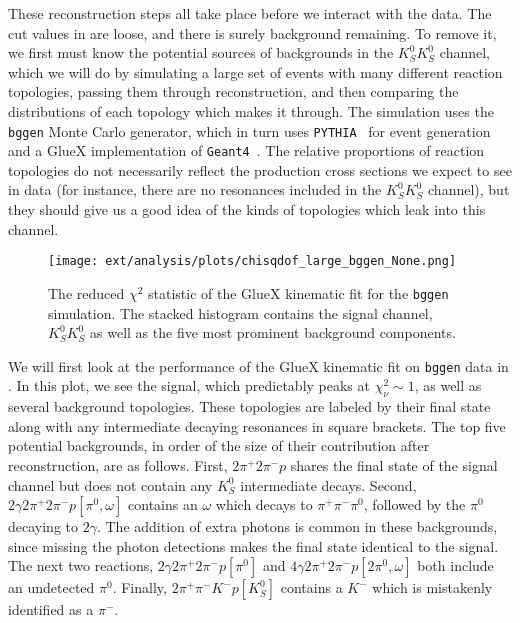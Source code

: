 These reconstruction steps all take place before we interact with the data. The cut values in  are loose, and there is surely background remaining. To remove it, we first must know the potential sources of backgrounds in the $K_S^0K_S^0$ channel, which we will do by simulating a large set of events with many different reaction topologies, passing them through reconstruction, and then comparing the distributions of each topology which makes it through. The simulation uses the \texttt{bggen} Monte Carlo generator, which in turn uses \texttt{PYTHIA}~\cite{Bierlich2022} for event generation and a GlueX implementation of \texttt{Geant4}~\cite{Allison2006,Allison2016,Agostinelli2003}. The relative proportions of reaction topologies do not necessarily reflect the production cross sections we expect to see in data (for instance, there are no resonances included in the $K_S^0K_S^0$ channel), but they should give us a good idea of the kinds of topologies which leak into this channel.

\begin{figure}
  \begin{center}
    \texttt{[image: ext/analysis/plots/chisqdof\_large\_bggen\_None.png]}
  \end{center}
  \caption{The reduced $\chi^2$ statistic of the GlueX kinematic fit for the \texttt{bggen} simulation. The stacked histogram contains the signal channel, $K_S^0K_S^0$ as well as the five most prominent background components.}\label{fig:bggen-chisqdof}
\end{figure}

We will first look at the performance of the GlueX kinematic fit on \texttt{bggen} data in . In this plot, we see the signal, which predictably peaks at $\chi^2_\nu \sim 1$, as well as several background topologies. These topologies are labeled by their final state along with any intermediate decaying resonances in square brackets. The top five potential backgrounds, in order of the size of their contribution after reconstruction, are as follows. First, $2\pi^+2\pi^- p$ shares the final state of the signal channel but does not contain any $K_S^0$ intermediate decays. Second, $2\gamma 2\pi^+ 2\pi^- p [\pi^0, \omega]$ contains an $\omega$ which decays to $\pi^+\pi^-\pi^0$, followed by the $\pi^0$ decaying to $2\gamma$. The addition of extra photons is common in these backgrounds, since missing the photon detections makes the final state identical to the signal. The next two reactions, $2\gamma 2\pi^+ 2\pi^- p [\pi^0]$ and $4\gamma 2\pi^+ 2\pi^- p [2\pi^0, \omega]$ both include an undetected $\pi^0$. Finally, $2\pi^+\pi^- K^- p[K_S^0]$ contains a $K^-$ which is mistakenly identified as a $\pi^-$.

